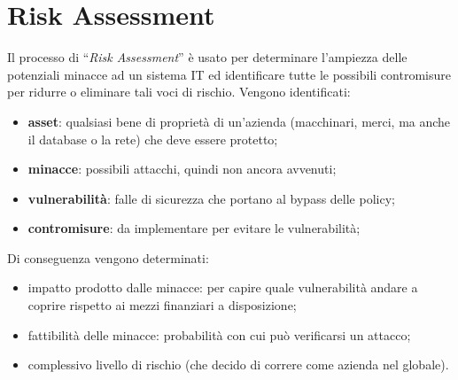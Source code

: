 \section{Risk Assessment}

Il processo di ``\textit{Risk Assessment}'' è usato per determinare l'ampiezza
delle potenziali minacce ad un sistema IT ed identificare tutte le possibili
contromisure per ridurre o eliminare tali voci di rischio.
Vengono identificati:

\begin{itemize}
    \item \textbf{asset}: qualsiasi bene di proprietà di un'azienda
          (macchinari, merci, ma anche il database o
          la rete) che deve essere protetto;
    \item \textbf{minacce}: possibili attacchi, quindi non ancora avvenuti;
    \item \textbf{vulnerabilità}: falle di sicurezza che portano al bypass delle policy;
    \item \textbf{contromisure}: da implementare per evitare le vulnerabilità;
\end{itemize}

Di conseguenza vengono determinati:

\begin{itemize}
    \item impatto prodotto dalle minacce: per capire quale vulnerabilità
          andare a coprire rispetto ai
          mezzi finanziari a disposizione;
    \item fattibilità delle minacce: probabilità con cui può verificarsi
          un attacco;
    \item complessivo livello di rischio
          (che decido di correre come azienda nel globale).
\end{itemize}
